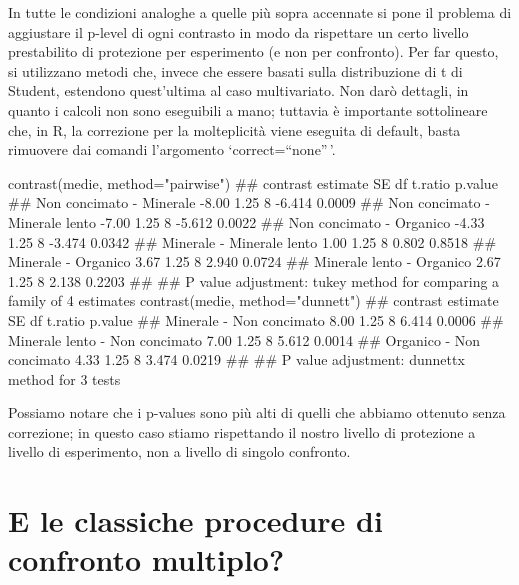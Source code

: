 \documentclass[a4paper,12pt,oneside]{book}
\newenvironment{Shaded}{}{}
\newcommand{\KeywordTok}[1]{#1}
\newcommand{\DataTypeTok}[1]{#1}
\newcommand{\StringTok}[1]{#1}
\newcommand{\CommentTok}[1]{#1}
\newcommand{\NormalTok}[1]{#1}
\begin{document}
In tutte le condizioni analoghe a quelle più sopra accennate si pone il problema di aggiustare il p-level di ogni contrasto in modo da rispettare un certo livello prestabilito di protezione per esperimento (e non per confronto). Per far questo, si utilizzano metodi che, invece che essere basati sulla distribuzione di t di Student, estendono quest'ultima al caso multivariato. Non darò dettagli, in quanto i calcoli non sono eseguibili a mano; tuttavia è importante sottolineare che, in R, la correzione per la molteplicità viene eseguita di default, basta rimuovere dai comandi l'argomento `correct=``none''\,'.

\small

\begin{Shaded}
\begin{Highlighting}[]
\KeywordTok{contrast}\NormalTok{(medie, }\DataTypeTok{method=}\StringTok{"pairwise"}\NormalTok{)}
\CommentTok{##  contrast                       estimate   SE df t.ratio p.value}
\CommentTok{##  Non concimato - Minerale          -8.00 1.25  8 -6.414  0.0009 }
\CommentTok{##  Non concimato - Minerale lento    -7.00 1.25  8 -5.612  0.0022 }
\CommentTok{##  Non concimato - Organico          -4.33 1.25  8 -3.474  0.0342 }
\CommentTok{##  Minerale - Minerale lento          1.00 1.25  8  0.802  0.8518 }
\CommentTok{##  Minerale - Organico                3.67 1.25  8  2.940  0.0724 }
\CommentTok{##  Minerale lento - Organico          2.67 1.25  8  2.138  0.2203 }
\CommentTok{## }
\CommentTok{## P value adjustment: tukey method for comparing a family of 4 estimates}
\KeywordTok{contrast}\NormalTok{(medie, }\DataTypeTok{method=}\StringTok{"dunnett"}\NormalTok{)}
\CommentTok{##  contrast                       estimate   SE df t.ratio p.value}
\CommentTok{##  Minerale - Non concimato           8.00 1.25  8 6.414   0.0006 }
\CommentTok{##  Minerale lento - Non concimato     7.00 1.25  8 5.612   0.0014 }
\CommentTok{##  Organico - Non concimato           4.33 1.25  8 3.474   0.0219 }
\CommentTok{## }
\CommentTok{## P value adjustment: dunnettx method for 3 tests}
\end{Highlighting}
\end{Shaded}

\normalsize

Possiamo notare che i p-values sono più alti di quelli che abbiamo ottenuto senza correzione; in questo caso stiamo rispettando il nostro livello di protezione a livello di esperimento, non a livello di singolo confronto.

\hypertarget{e-le-classiche-procedure-di-confronto-multiplo}{%
\section{E le classiche procedure di confronto multiplo?}\label{e-le-classiche-procedure-di-confronto-multiplo}}
\end{document}
